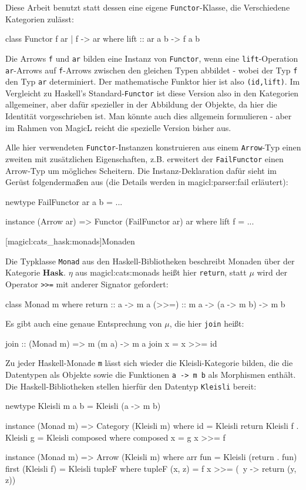 \documentclass[a4paper, bibgerm]{book}
\newcommand\icode[1]{\lstinline?#1?}
\newcommand\lsubsection{}
\newcommand\sref{}
\begin{document}
Diese Arbeit benutzt statt dessen eine eigene \icode{Functor}-Klasse,
die Verschiedene Kategorien zulässt:
\begin{code}
class Functor f ar | f -> ar where
  lift :: ar a b -> f a b
\end{code}
Die Arrows \icode{f} und \icode{ar} bilden eine Instanz von
\icode{Functor}, wenn eine \icode{lift}-Operation \icode{ar}-Arrows auf
\icode{f}-Arrows zwischen den gleichen Typen abbildet - wobei der Typ
\icode{f} den Typ \icode{ar} determiniert. Der mathematische Funktor
hier ist also \icode{(id,lift)}. Im Vergleicht zu Haskell's
Standard-\icode{Functor} ist diese Version also in den Kategorien
allgemeiner, aber dafür spezieller in der Abbildung der Objekte, da hier
die Identität vorgeschrieben ist. Man könnte auch dies allgemein
formulieren - aber im Rahmen von MagicL reicht die spezielle Version
bisher aus.

Alle hier verwendeten \icode{Functor}-Instanzen konstruieren aus einem
\icode{Arrow}-Typ einen zweiten mit zusätzlichen Eigenschaften,
z.B. erweitert der \icode{FailFunctor} einen Arrow-Typ um mögliches
Scheitern. Die Instanz-Deklaration dafür sieht im Gerüst folgendermaßen
aus (die Details werden in \sref{magicl:parser:fail} erläutert):
\begin{code}
newtype FailFunctor ar a b = ...

instance (Arrow ar) => Functor (FailFunctor ar) ar where
  lift f = ...
\end{code}

\lsubsection[magicl:cats_hask:monads]{Monaden}

Die Typklasse \icode{Monad} aus den Haskell-Bibliotheken beschreibt
Monaden über der Kategorie $\mathbf{Hask}$. $\eta$ aus
\sref{magicl:cats:monads} heißt hier \icode{return}, statt $\mu$ wird der
Operator \icode{>>=} %
mit anderer Signator gefordert:
\begin{code}
class Monad m where
  return :: a -> m a
  (>>=)  :: m a -> (a -> m b) -> m b
\end{code} %
Es gibt auch eine genaue Entsprechung von $\mu$, die hier \icode{join}
heißt:
\begin{code}
join :: (Monad m) => m (m a) -> m a
join x = x >>= id
\end{code} %

Zu jeder Haskell-Monade \icode{m} lässt sich wieder die
Kleisli-Kategorie bilden, die die Datentypen als Objekte sowie die
Funktionen \icode{a -> m b} als Morphismen enthält. Die
Haskell-Bibliotheken stellen hierfür den Datentyp \icode{Kleisli}
bereit:
\begin{code}
newtype Kleisli m a b = Kleisli (a -> m b)

instance (Monad m) => Category (Kleisli m)
  where id = Kleisli return
        Kleisli f . Kleisli g = Kleisli composed
          where composed x = g x >>= f

instance (Monad m) => Arrow (Kleisli m)
  where arr fun = Kleisli (return . fun)
        first (Kleisli f) = Kleisli tupleF
          where tupleF (x, z) = f x >>= (\ y -> return (y, z))
\end{code} %
\end{document}
